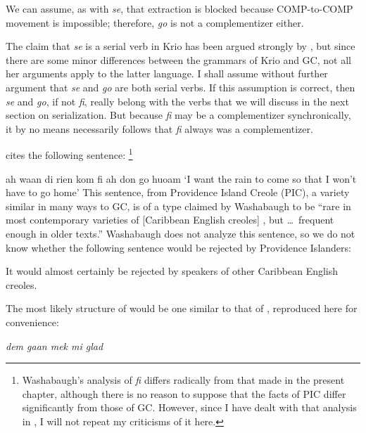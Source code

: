 \z
We can assume, as with \textit{se}, that extraction is blocked because COMP-to-COMP movement is impossible; therefore, \textit{go} is not a complementizer either.

The claim that \textit{se} is a serial verb in Krio has been argued strongly by \citet{Larimore1976}, but since there are some minor differences between the grammars of Krio and GC, not all her arguments apply to the latter language. I shall assume without further argument that \textit{se} and \textit{go} are both serial verbs. If this assumption is correct, then \textit{se} and \textit{go}, if not \textit{fi}, really belong with the verbs that we will discuss in the next section on serialization. But because \textit{fi} may be a complementizer synchronically, it by no means necessarily follows that \textit{fi} always was a complementizer.

\citet[Example 9]{Washabaugh1979} cites the following sentence: \footnote{Washabaugh's analysis of \textit{fi} differs radically from that made in the present chapter, although there is no reason to suppose that the facts of PIC differ significantly from those of GC. However, since I have dealt with that analysis in \citet{Bickerton1980}, I will not repeat my criticisms of it here.}

\ea\label{ex:2:220}
ah waan di rien kom fi ah don go huoam
\glt `I want the rain to come so that I won't have to go home'
\z
This sentence, from Providence Island Creole (PIC), a variety similar in many ways to GC, is of a type claimed by Washabaugh to be ``rare in most contemporary varieties of [Caribbean English creoles] , but \ldots~frequent enough in older texts.'' Washabaugh does not analyze this sentence, so we do not know whether the following sentence would be rejected by Providence Islanders:

\z
It would almost certainly be rejected by speakers of other Caribbean English creoles.

The most likely structure of  would be one similar to that of , reproduced here for convenience: 

\begin{exe}
 \textit{dem gaan mek mi glad}
\end{exe}

